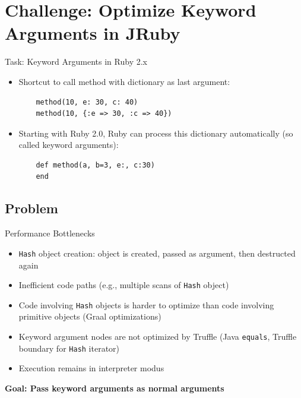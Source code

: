 \documentclass[xcolor=dvipsname,handout]{beamer} %
\begin{document}
\section{Challenge: Optimize Keyword Arguments in JRuby}

\begin{frame}[fragile]{Task: Keyword Arguments in Ruby 2.x}

\begin{itemize}
 \item Shortcut to call method with dictionary as last argument:
    \begin{lstlisting}
    method(10, e: 30, c: 40)
    method(10, {:e => 30, :c => 40})
    \end{lstlisting}
  \item Starting with Ruby 2.0, Ruby can process this dictionary automatically (so called keyword arguments):
    \begin{lstlisting}
    def method(a, b=3, e:, c:30)
    end
    \end{lstlisting}
\end{itemize}
\end{frame}


\subsection{Problem}

\begin{frame}{Performance Bottlenecks}
\begin{itemize}
    \item \lstinline{Hash} object creation: object is created, passed as argument, then destructed again
    \item Inefficient code paths (e.g., multiple scans of \lstinline{Hash} object)
    \item Code involving \lstinline{Hash} objects is harder to optimize than code involving primitive objects (Graal optimizations)
    \item Keyword argument nodes are not optimized by Truffle (Java \lstinline{equals}, Truffle boundary for \lstinline{Hash} iterator)
    \item Execution remains in interpreter modus
\end{itemize}

\begin{table}
    \centering
\textbf{Goal: Pass keyword arguments as normal arguments}
\end{table}
\end{frame}
\end{document}
